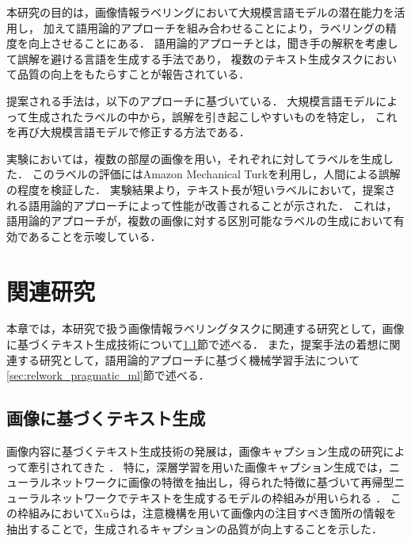 \documentclass[a4paper,11pt]{jreport}
\begin{document}
本研究の目的は，画像情報ラベリングにおいて大規模言語モデルの潜在能力を活用し，
加えて語用論的アプローチを組み合わせることにより，ラベリングの精度を向上させることにある．
語用論的アプローチとは，聞き手の解釈を考慮して誤解を避ける言語を生成する手法であり，
複数のテキスト生成タスクにおいて品質の向上をもたらすことが報告されている．

提案される手法は，以下のアプローチに基づいている．
大規模言語モデルによって生成されたラベルの中から，誤解を引き起こしやすいものを特定し，
これを再び大規模言語モデルで修正する方法である．

実験においては，複数の部屋の画像を用い，それぞれに対してラベルを生成した．
このラベルの評価にはAmazon Mechanical Turkを利用し，人間による誤解の程度を検証した．
実験結果より，テキスト長が短いラベルにおいて，提案される語用論的アプローチによって性能が改善されることが示された．
これは，語用論的アプローチが，複数の画像に対する区別可能なラベルの生成において有効であることを示唆している．

%



\chapter{関連研究}

本章では，本研究で扱う画像情報ラベリングタスクに関連する研究として，画像に基づくテキスト生成技術について\ref{sec:relwork_image_captioning}節で述べる．
また，提案手法の着想に関連する研究として，語用論的アプローチに基づく機械学習手法について\ref{sec:relwork_pragmatic_ml}節で述べる．

\section{画像に基づくテキスト生成}
\label{sec:relwork_image_captioning}
画像内容に基づくテキスト生成技術の発展は，画像キャプション生成の研究によって牽引されてきた \cite{Farhadi2010}．
特に，深層学習を用いた画像キャプション生成では，ニューラルネットワークに画像の特徴を抽出し，得られた特徴に基づいて再帰型ニューラルネットワークでテキストを生成するモデルの枠組みが用いられる \cite{Vinyals2017}．
この枠組みにおいてXuら\cite{Xu2015}は，注意機構を用いて画像内の注目すべき箇所の情報を抽出することで，生成されるキャプションの品質が向上することを示した．
\end{document}
